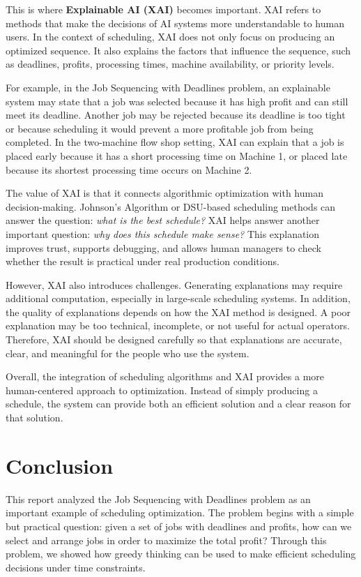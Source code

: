 \documentclass[11pt,a4paper]{article}
\begin{document}
This is where \textbf{Explainable AI (XAI)} becomes important. XAI refers to methods that make the decisions of AI systems more understandable to human users. In the context of scheduling, XAI does not only focus on producing an optimized sequence. It also explains the factors that influence the sequence, such as deadlines, profits, processing times, machine availability, or priority levels.

For example, in the Job Sequencing with Deadlines problem, an explainable system may state that a job was selected because it has high profit and can still meet its deadline. Another job may be rejected because its deadline is too tight or because scheduling it would prevent a more profitable job from being completed. In the two-machine flow shop setting, XAI can explain that a job is placed early because it has a short processing time on Machine 1, or placed late because its shortest processing time occurs on Machine 2.

The value of XAI is that it connects algorithmic optimization with human decision-making. Johnson's Algorithm or DSU-based scheduling methods can answer the question: \textit{what is the best schedule?} XAI helps answer another important question: \textit{why does this schedule make sense?} This explanation improves trust, supports debugging, and allows human managers to check whether the result is practical under real production conditions.

However, XAI also introduces challenges. Generating explanations may require additional computation, especially in large-scale scheduling systems. In addition, the quality of explanations depends on how the XAI method is designed. A poor explanation may be too technical, incomplete, or not useful for actual operators. Therefore, XAI should be designed carefully so that explanations are accurate, clear, and meaningful for the people who use the system.

Overall, the integration of scheduling algorithms and XAI provides a more human-centered approach to optimization. Instead of simply producing a schedule, the system can provide both an efficient solution and a clear reason for that solution.

\section{Conclusion}

This report analyzed the Job Sequencing with Deadlines problem as an important example of scheduling optimization. The problem begins with a simple but practical question: given a set of jobs with deadlines and profits, how can we select and arrange jobs in order to maximize the total profit? Through this problem, we showed how greedy thinking can be used to make efficient scheduling decisions under time constraints.
\end{document}
